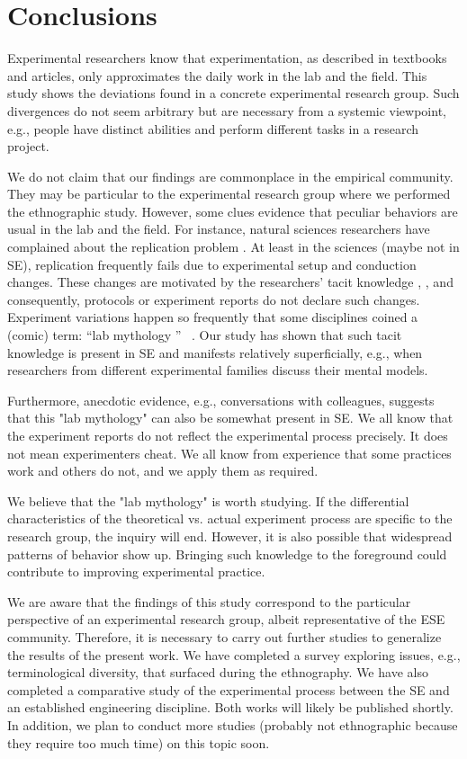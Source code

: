\section{Conclusions}\label{sec-conclusions}
Experimental researchers know that experimentation, as described in textbooks and articles, only approximates the daily work in the lab and the field. This study shows the deviations found in a concrete experimental research group. Such divergences do not seem arbitrary but are necessary from a systemic viewpoint, e.g., people have distinct abilities and perform different tasks in a research project.

We do not claim that our findings are commonplace in the empirical community. They may be particular to the experimental research group where we performed the ethnographic study. However, some clues evidence that peculiar behaviors are usual in the lab and the field. For instance, natural sciences researchers have complained about the replication problem \cite{hines2014sorting}. At least in the sciences (maybe not in SE), replication frequently fails due to experimental setup and conduction changes. These changes are motivated by the researchers' tacit knowledge \cite{Polanyi-1996-tacit-k}, \cite{Shull-2002-replicating-SE-experiments-tacit-k}, and consequently, protocols or experiment reports do not declare such changes. Experiment variations happen so frequently that some disciplines coined a (comic) term: \textquotedblleft lab mythology \textquotedblright~\cite{ruben2011experimental} \cite{loukides2015beyond}. Our study has shown that such tacit knowledge is present in SE and manifests relatively superficially, e.g., when researchers from different experimental families discuss their mental models.

Furthermore, anecdotic evidence, e.g., conversations with colleagues, suggests that this "lab mythology" can also be somewhat present in SE. We all know that the experiment reports do not reflect the experimental process precisely. It does not mean experimenters cheat. We all know from experience that some practices work and others do not, and we apply them as required.

We believe that the "lab mythology" is worth studying. If the differential characteristics of the theoretical vs. actual experiment process are specific to the research group, the inquiry will end. However, it is also possible that widespread patterns of behavior show up. Bringing such knowledge to the foreground could contribute to improving experimental practice.

We are aware that the findings of this study correspond to the particular perspective of an experimental research group, albeit representative of the ESE community. Therefore, it is necessary to carry out further studies to generalize the results of the present work. We have completed a survey exploring issues, e.g., terminological diversity, that surfaced during the ethnography. We have also completed a comparative study of the experimental process between the SE and an established engineering discipline. Both works will likely be published shortly. In addition, we plan to conduct more studies (probably not ethnographic because they require too much time) on this topic soon.